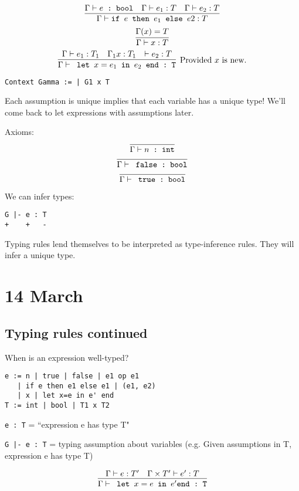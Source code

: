 \documentclass[11pt]{article}
\begin{document}
\[
    \infer{\Gamma \vdash \verb~if ~ e \verb~ then ~ e_1 \verb~ else ~ e2 : T}{
        \Gamma \vdash e \verb~ : bool~
        &
        \Gamma \vdash e_1 : T
        &
        \Gamma \vdash e_2 : T
    }
\]
\[
    \infer{\Gamma \vdash x : T}{
        \Gamma(x) = T
    }
\]
\[
    \infer[\textnormal{Provided $x$ is new.}]{\Gamma \vdash \verb~ let ~ x = e_1 \verb~ in ~ e_2 \verb~ end : T~}{
        \Gamma \vdash e_1 : T_1
        &
        \Gamma_1 x : T_1
        &
        \vdash e_2 : T
    }
\]
\begin{verbatim}
Context Gamma := | G1 x T
\end{verbatim}

Each assumption is unique implies that each variable has a unique type! We'll come back to let expressions with assumptions later.

Axioms:
\[
    \infer{\Gamma \vdash n \verb~ : int~}{}
\]
\[
    \infer{\Gamma \vdash \verb~ false : bool~}{}
\]
\[
    \infer{\Gamma \vdash \verb~ true : bool~}{}
\]

We can infer types:
\begin{verbatim}
G |- e : T
+    +   -
\end{verbatim}

Typing rules lend themselves to be interpreted as type-inference rules. They will infer a unique type.

\section{14 March}
\subsection{Typing rules continued}
When is an expression well-typed?

\begin{verbatim}
e := n | true | false | e1 op e1
   | if e then e1 else e1 | (e1, e2)
   | x | let x=e in e' end
T := int | bool | T1 x T2
\end{verbatim}

\verb~e : T~ = ``expression e has type T"


\verb~G |- e : T~ = typing assumption about variables (e.g. Given assumptions in T, expression e has type T)

\[
    \infer{\Gamma \vdash \verb~ let ~ x = e \verb~ in ~ e^{\prime} \verb~end : T~}{
        \Gamma \vdash e : T^{\prime}
        &
        \Gamma \times T^{\prime} \vdash e^{\prime} : T
    }
\]
\end{document}
